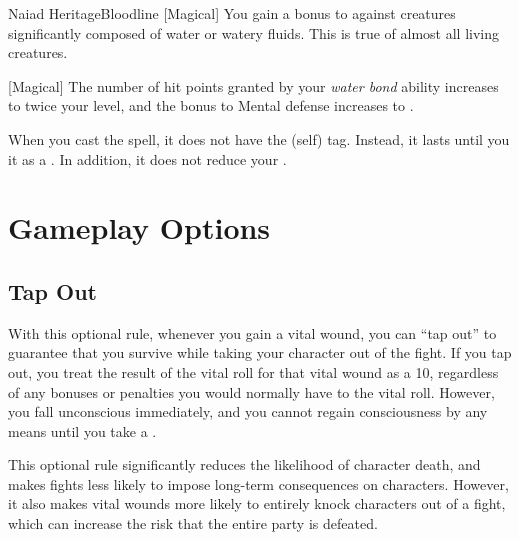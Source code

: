 \begin{feat}{Naiad Heritage}{Bloodline}
        [Magical] You gain a  bonus to  against creatures significantly composed of water or watery fluids.
        This is true of almost all living creatures.

        [Magical] The number of hit points granted by your \textit{water bond} ability increases to twice your level, and the bonus to Mental defense increases to .

         When you cast the  spell, it does not have the  (self) tag.
        Instead, it lasts until you  it as a .
        In addition, it does not reduce your .
    \end{feat}

\section{Gameplay Options}
    \subsection{Tap Out}
        With this optional rule, whenever you gain a vital wound, you can ``tap out'' to guarantee that you survive while taking your character out of the fight.
        If you tap out, you treat the result of the vital roll for that vital wound as a 10, regardless of any bonuses or penalties you would normally have to the vital roll.
        However, you fall unconscious immediately, and you cannot regain consciousness by any means until you take a .

        This optional rule significantly reduces the likelihood of character death, and makes fights less likely to impose long-term consequences on characters.
        However, it also makes vital wounds more likely to entirely knock characters out of a fight, which can increase the risk that the entire party is defeated.

